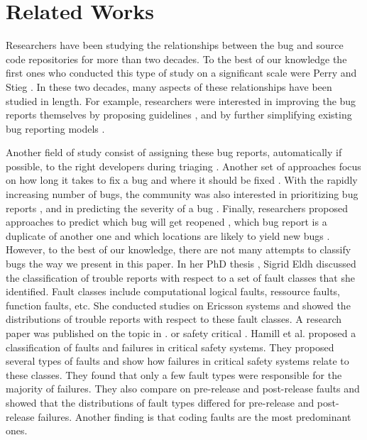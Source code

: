 \section{Related Works}

Researchers have been studying the relationships between
the bug and source code repositories for more than two decades.
To the best of our knowledge the first ones who conducted this type of study on a significant scale were Perry and Stieg \cite{PerryDewayneE.1993}.
In these two decades, many aspects of these relationships have been studied in length.
For example, researchers were interested in improving the bug reports themselves by proposing guidelines \cite{Bettenburg2008}, and by further simplifying existing bug reporting models \cite{Herraiz2008}.

Another field of study consist of assigning these bug reports, automatically if possible, to the right developers during triaging \cite{Anvik2006,Jeong2009,Tamrawi2011a,Bortis2013}.
Another set of approaches focus on how long it takes to fix a bug
\cite{Zhang2013,Bhattacharya2011,Saha2014} and where it should be fixed \cite{Zhou2012,Zeller2013a}.
With the rapidly increasing number of bugs, the community was also interested in prioritizing bug reports \cite{Kim2011c}, and in predicting the severity of a bug \cite{Lamkanfi2010}.
Finally, researchers proposed approaches to predict which bug will get reopened \cite{Zimmermann2012,Lo2013}, which bug report is a duplicate of another one \cite{Bettenburg2008a,Tian2012a,Jalbert2008} and which locations are likely to yield new bugs \cite{Kim2007,Kim2006,Tufano2015}.
However, to the best of our knowledge, there are not many attempts to classify bugs the way we present in this paper.
In her PhD thesis \cite{Eldh2001}, Sigrid Eldh discussed the classification of trouble reports with respect to a set of fault classes that she identified.
Fault classes include computational logical faults, ressource faults, function faults, etc.
She conducted studies on Ericsson systems and showed the distributions of trouble reports with respect to these fault classes.
A research paper was published on the topic in \cite{Eldh2001}.
or safety critical \cite{Hamill2014}.
Hamill et al. \cite{Hamill2014} proposed a classification of faults and failures in critical safety systems.
They proposed several types of faults and show how failures in critical safety systems relate to these classes.
They found that only a few fault types were responsible for the majority of failures.
They also compare on pre-release and post-release faults and showed that the distributions of fault types differed for pre-release and post-release failures.
Another finding is that coding faults are the most predominant ones.

